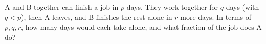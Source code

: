 A and B together can finish a job in $p$ days. They work together for $q$ days (with $q<p$), then A leaves, and B finishes the rest alone in $r$ more days. In terms of $p,q,r$, how many days would each take alone, and what fraction of the job does A do?
